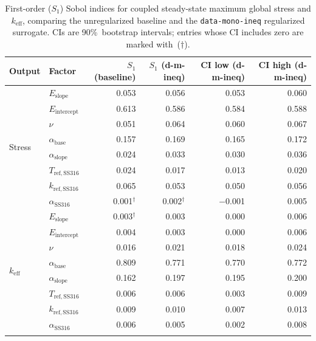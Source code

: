 \documentclass[pdflatex,sn-mathphys-num]{sn-jnl}
\theoremstyle{thmstyleone}
\theoremstyle{thmstyletwo}
\theoremstyle{thmstylethree}
\begin{document}
\begin{appendices}
\begin{table}[ht]
\caption{%
  First-order ($S_{1}$) Sobol indices for coupled steady-state maximum global stress
  and $k_{\mathrm{eff}}$, comparing the unregularized baseline and the
  \texttt{data-mono-ineq} regularized surrogate.
  CIs are 90\%~bootstrap intervals; entries whose CI includes zero are marked with~($\dag$).
}\label{tab:sobol_full}
\begin{tabular*}{\textwidth}{@{\extracolsep\fill}llrrrr@{}}
\toprule
Output & Factor & $S_{1}$ (baseline) & $S_{1}$ (d-m-ineq) & CI low (d-m-ineq) & CI high (d-m-ineq) \\
\midrule
\multirow{8}{*}{Stress}
  & $E_{\mathrm{slope}}$       & 0.053 & 0.056 & 0.053 & 0.060 \\
  & $E_{\mathrm{intercept}}$   & 0.613 & 0.586 & 0.584 & 0.588 \\
  & $\nu$                      & 0.051 & 0.064 & 0.060 & 0.067 \\
  & $\alpha_{\mathrm{base}}$   & 0.157 & 0.169 & 0.165 & 0.172 \\
  & $\alpha_{\mathrm{slope}}$  & 0.024 & 0.033 & 0.030 & 0.036 \\
  & $T_{\mathrm{ref,SS316}}$   & 0.024 & 0.017 & 0.013 & 0.020 \\
  & $k_{\mathrm{ref,SS316}}$   & 0.065 & 0.053 & 0.050 & 0.056 \\
  & $\alpha_{\mathrm{SS316}}$  & 0.001$^\dag$ & 0.002$^\dag$ & $-$0.001 & 0.005 \\
\midrule
\multirow{8}{*}{$k_{\mathrm{eff}}$}
  & $E_{\mathrm{slope}}$       & 0.003$^\dag$ & 0.003 & 0.000 & 0.006 \\
  & $E_{\mathrm{intercept}}$   & 0.004 & 0.003 & 0.000 & 0.006 \\
  & $\nu$                      & 0.016 & 0.021 & 0.018 & 0.024 \\
  & $\alpha_{\mathrm{base}}$   & 0.809 & 0.771 & 0.770 & 0.772 \\
  & $\alpha_{\mathrm{slope}}$  & 0.162 & 0.197 & 0.195 & 0.200 \\
  & $T_{\mathrm{ref,SS316}}$   & 0.006 & 0.006 & 0.003 & 0.009 \\
  & $k_{\mathrm{ref,SS316}}$   & 0.009 & 0.010 & 0.007 & 0.013 \\
  & $\alpha_{\mathrm{SS316}}$  & 0.006 & 0.005 & 0.002 & 0.008 \\
\botrule
\end{tabular*}
\end{table}


\end{appendices}
\end{document}
